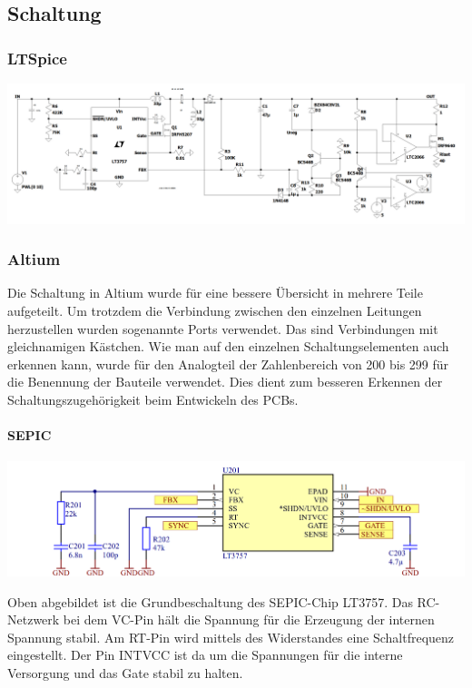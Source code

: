 \documentclass[paper=a4, 12pt]{scrreprt}
\begin{document}
		\subsection{Schaltung}\hfill \break
			\subsubsection{LTSpice}\hfill \break
			\begin{adjustbox}{angle=90, center,caption={Simulationsschaltung des Analogteils in LTSpice},label={fig:LTSpice-Schaltung-Analogteil},nofloat=figure,vspace=\bigskipamount}
				\includegraphics[width=20cm]{img/LTSpice_Schaltung_Analogteil.PNG}
			\end{adjustbox}
			\pagebreak
			\subsubsection{Altium}\hfill \break
			Die Schaltung in Altium wurde für eine bessere Übersicht in mehrere Teile aufgeteilt. Um trotzdem die Verbindung zwischen den einzelnen Leitungen herzustellen wurden sogenannte Ports verwendet. Das sind Verbindungen mit gleichnamigen Kästchen. Wie man auf den einzelnen Schaltungselementen auch erkennen kann, wurde für den Analogteil der Zahlenbereich von 200 bis 299 für die Benennung der Bauteile verwendet. Dies dient zum besseren Erkennen der Schaltungszugehörigkeit beim Entwickeln des PCBs.
			\paragraph{SEPIC}\hfill \break
			\begin{adjustbox}{center,caption={Grundbeschaltung des LT3757},label={fig:LT3757-Grundbeschaltung},nofloat=figure,vspace=\bigskipamount}
				\includegraphics[width=\textwidth]{img/SEPIC_Altium.PNG}
			\end{adjustbox}
			Oben abgebildet ist die Grundbeschaltung des SEPIC-Chip LT3757. Das RC-Netzwerk bei dem VC-Pin hält die Spannung für die Erzeugung der internen Spannung stabil. Am RT-Pin wird mittels des Widerstandes eine Schaltfrequenz eingestellt. Der Pin INTVCC ist da um die Spannungen für die interne Versorgung und das Gate stabil zu halten.
\end{document}
